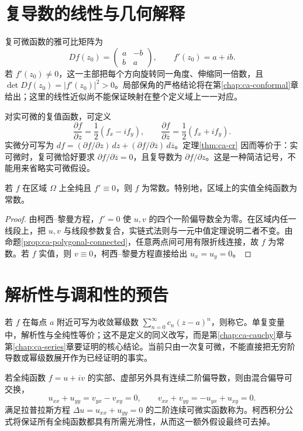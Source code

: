 \documentclass[UTF8,12pt,a4paper,fontset=fandol]{ctexbook}
\begin{document}
\section{复导数的线性与几何解释}

复可微函数的雅可比矩阵为
\[
 Df(z_0)=\begin{pmatrix}a&-b\\ b&a\end{pmatrix},\qquad
 f'(z_0)=a+ib.
\]
若 $f'(z_0)\ne0$，这一主部把每个方向旋转同一角度、伸缩同一倍数，且 $\det Df(z_0)=|f'(z_0)|^2>0$。局部保角的严格结论将在第\ref{chap:ca-conformal}章给出；这里的线性近似尚不能保证映射在整个定义域上一一对应。

对实可微的复值函数，可定义
\[
 \frac{\partial f}{\partial z}=\frac12(f_x-if_y),\qquad
 \frac{\partial f}{\partial\overline z}=\frac12(f_x+if_y).
\]
实微分可写为 $df=(\partial f/\partial z)\,dz+(\partial f/\partial\overline z)\,d\overline z$。定理\ref{thm:ca-cr} 因而等价于：实可微时，复可微恰好要求 $\partial f/\partial\overline z=0$，且复导数为 $\partial f/\partial z$。这是一种简洁记号，不能用来省略实可微假设。

\begin{proposition}
\label{prop:ca-zero-derivative}
若 $f$ 在区域 $\Omega$ 上全纯且 $f'\equiv0$，则 $f$ 为常数。特别地，区域上的实值全纯函数为常数。
\end{proposition}
\begin{proof}
由柯西--黎曼方程，$f'=0$ 使 $u,v$ 的四个一阶偏导数全为零。在区域内任一线段上，把 $u,v$ 与线段参数复合，实链式法则与一元中值定理说明二者不变。由命题\ref{prop:ca-polygonal-connected}，任意两点间可用有限折线连接，故 $f$ 为常数。若 $f$ 实值，则 $v\equiv0$，柯西--黎曼方程直接给出 $u_x=u_y=0$。
\end{proof}

\section{解析性与调和性的预告}

若 $f$ 在每点 $a$ 附近可写为收敛幂级数 $\sum_{n=0}^{\infty}c_n(z-a)^n$，则称它。单复变量中，解析性与全纯性等价；这不是定义的同义改写，而是第\ref{chap:ca-cauchy}章与第\ref{chap:ca-series}章要证明的核心结论。当前只由一次复可微，不能直接把无穷阶导数或幂级数展开作为已经证明的事实。

若全纯函数 $f=u+iv$ 的实部、虚部另外具有连续二阶偏导数，则由混合偏导可交换，
\[
 u_{xx}+u_{yy}=v_{yx}-v_{xy}=0,\qquad
 v_{xx}+v_{yy}=-u_{yx}+u_{xy}=0.
\]
满足拉普拉斯方程 $\Delta u=u_{xx}+u_{yy}=0$ 的二阶连续可微实函数称为。柯西积分公式将保证所有全纯函数都具有所需光滑性，从而这一额外假设最终可去掉。
\end{document}

